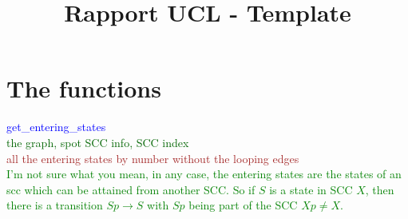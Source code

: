 \documentclass{rapport}
\title{Rapport UCL - Template} %
\newcommand{\pscrep}[1]{\textcolor{green}{#1}}
\begin{document}





\fairemarges %
\fairepagedegarde %
\tabledematieres %



\section{The functions}

\textcolor{blue}{get_entering_states} \\
\textcolor[HTML]{006400}{the graph, spot SCC info, SCC index} \\
\textcolor{brown}{all the entering states by number without the looping edges} \\
\pscrep{I'm not sure what you mean, in any case, the entering states
are the states of an scc which can be attained from another SCC.
So if $S$ is a state in SCC $X$, then there is a transition $Sp\rightarrow S$
with $Sp$ being part of the SCC $Xp \neq X$.}
\end{document}
